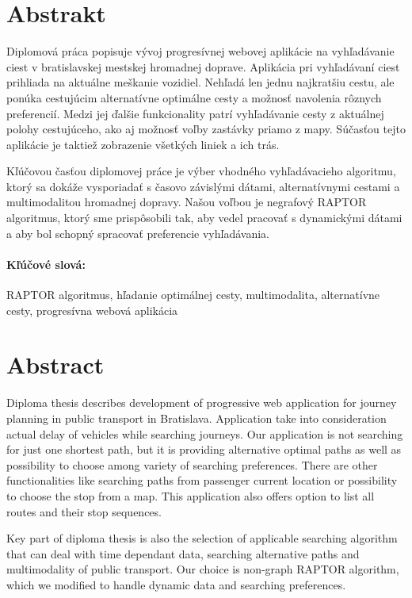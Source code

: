 \documentclass[12pt, oneside]{book}
\begin{document}

\newpage 
\section*{Abstrakt}
Diplomová práca popisuje vývoj progresívnej webovej aplikácie na vyhľadávanie ciest v bratislavskej mestskej hromadnej doprave. Aplikácia pri vyhľadávaní ciest prihliada na aktuálne meškanie vozidiel. Nehľadá len jednu najkratšiu cestu, ale ponúka cestujúcim alternatívne optimálne cesty a možnosť navolenia rôznych preferencií. Medzi jej ďalšie funkcionality patrí vyhľadávanie cesty z aktuálnej polohy cestujúceho, ako aj možnosť voľby zastávky priamo z mapy. Súčasťou tejto aplikácie je taktiež zobrazenie všetkých liniek a ich trás.

Kľúčovou časťou diplomovej práce je výber vhodného vyhľadávacieho algoritmu, ktorý sa dokáže vysporiadať s časovo závislými dátami, alternatívnymi cestami a multimodalitou hromadnej dopravy. 
Našou voľbou je negrafový RAPTOR algoritmus, ktorý sme prispôsobili tak, aby vedel pracovať s dynamickými dátami a aby bol schopný spracovať preferencie vyhľadávania.

\paragraph*{Kľúčové slová:} 
RAPTOR algoritmus, hľadanie optimálnej cesty, multimodalita, alternatívne cesty, progresívna webová aplikácia


\newpage 
\section*{Abstract}
Diploma thesis describes development of progressive web application for journey planning in public transport in Bratislava. Application take into consideration actual delay of vehicles while searching journeys. Our application is not searching for just one shortest path, but it is providing alternative optimal paths as well as possibility to choose among variety of searching preferences. There are other functionalities like searching paths from passenger current location or possibility to choose the stop from a map. This application also offers option to list all routes and their stop sequences.

Key part of diploma thesis is also the selection of applicable searching algorithm that can deal with time dependant data, searching alternative paths and multimodality of public transport.  
Our choice is non-graph RAPTOR algorithm, which we modified to handle dynamic data and searching preferences.
\end{document}
